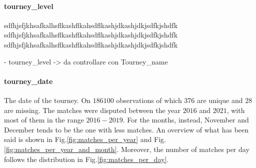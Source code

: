 \documentclass{article}
\begin{document}
\paragraph{tourney\_level}
sdfhjsfjkhsafkalhsflkashflkahsdflkashjdkashjdkjsdfkjshdfk
sdfhjsfjkhsafkalhsflkashflkahsdflkashjdkashjdkjsdfkjshdfk
sdfhjsfjkhsafkalhsflkashflkahsdflkashjdkashjdkjsdfkjshdfk

- tourney_level -> da controllare con Tourney_name


\paragraph{tourney\_date}
The date of the tourney. On $186100$ observations of which $376$ are unique and $28$ are missing. The matches were disputed between the year $2016$ and $2021$, with most of them in the range $2016-2019$. For the months, instead, November and December tends to be the one with less matches. An overview of what has been said is shown in Fig.\ref{fig:matches_per_year} and Fig.\ref{fig:matches_per_year_and_month}. Moreover, the number of matches per day follows the distribution in Fig.\ref{fig:matches_per_day}.
\end{document}
